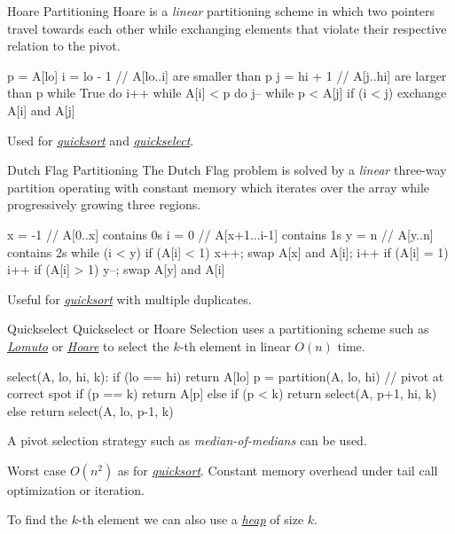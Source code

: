 \documentclass{cognito}
\begin{document}
\begin{note}{Hoare Partitioning}
	Hoare is a \emph{linear} partitioning scheme in which two pointers travel towards each other
	while exchanging elements that violate their respective relation to the pivot.
	\begin{largecode}
 p = A[lo]
 i = lo - 1  // A[lo..i] are smaller than p
 j = hi + 1 // A[j..hi] are larger than p
 while True
 	do i++ while A[i] < p
	do j-- while p < A[j]
	if (i < j) exchange A[i] and A[j]
	\end{largecode}
	
	\begin{remark} Used for \hyperref[note:Quicksort]{\it quicksort} and \hyperref[note:Quickselect]{\it quickselect}. \end{remark}
	\vspace{-5pt}
\end{note}

\begin{note}{Dutch Flag Partitioning}
	The Dutch Flag problem is solved by a \emph{linear} three-way partition operating with constant memory which iterates over the array
	while progressively growing three regions.
	\begin{largecode}
 x = -1  // A[0..x] contains 0s
 i = 0   // A[x+1...i-1] contains 1s
 y = n   // A[y..n] contains 2s
 while (i < y)
 	if (A[i] < 1) { x++; swap A[x] and A[i]; i++ }
	if (A[i] = 1) { i++ }
	if (A[i] > 1) { y--; swap A[y] and A[i] }
	\end{largecode}
	\begin{remark} Useful for \hyperref[note:Quicksort]{\it quicksort} with multiple duplicates. \end{remark}
	\vspace{-5pt}
\end{note}

\begin{note}{Quickselect}
	Quickselect or Hoare Selection uses a partitioning scheme such as \hyperref[note:Lomuto Partitioning]{\it Lomuto} or \hyperref[note:Hoare Partitioning]{\it Hoare}
	to select the $k$-th element in linear $O(n)$ time.
	\begin{largecode}
select(A, lo, hi, k):
	if (lo == hi) return A[lo]
	p = partition(A, lo, hi)  // pivot at correct spot
	if (p == k) return A[p]
	else if (p < k) return select(A, p+1, hi, k)
	else return select(A, lo, p-1, k)
	\end{largecode}
	A pivot selection strategy such as \emph{median-of-medians} can be used.
	\begin{remark} Worst case $O(n^2)$ as for \hyperref[note:Quicksort]{\it quicksort}.
		Constant memory overhead under tail call optimization or iteration.
	\end{remark}
	\begin{remark} To find the $k$-th element we can also use a \hyperref[note:Heap]{\it heap} of size $k$. \end{remark}
	\vspace{-5pt}
\end{note}
\end{document}
